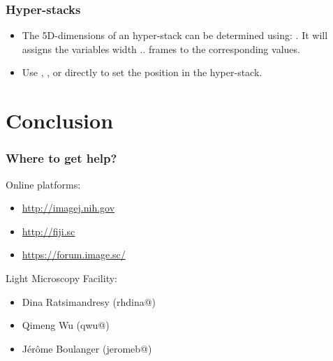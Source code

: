 \begin{frame}
  \frametitle<presentation>{Hyper-stacks}
  \begin{itemize}
  \item The 5D-dimensions of an hyper-stack can be determined using:
    . It
    will assigns the variables width .. frames to the corresponding
    values.
  \item Use , ,
     or directly
     to set the position in the
    hyper-stack.
  \end{itemize}
\end{frame}


\section{Conclusion}
\begin{frame}
	\frametitle<presentation>{Where to get help?}
	Online platforms:
	\begin{itemize}
		\item \url{http://imagej.nih.gov}
		\item \url{http://fiji.sc}
		\item \url{https://forum.image.sc/}
	\end{itemize}
	Light Microscopy Facility:
	\begin{itemize}
		\item Dina Ratsimandresy (rhdina@)
		\item Qimeng Wu (qwu@)
		\item J\'er\^ome Boulanger (jeromeb@)
	\end{itemize}
\end{frame}

